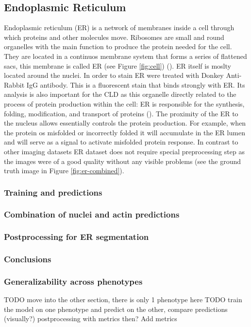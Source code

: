 \subsection{Endoplasmic Reticulum}
    Endoplasmic reticulum (ER) is a network of membranes inside a cell through which proteins and other molecules move. Ribosomes are small and round organelles with the main function to produce the protein needed for the cell. They are located in a continuos membrane system that forms a series of flattened sacs, this membrane is called ER (see Figure \ref{fig:cell}) (\cite{er}). ER itself is moslty located around the nuclei. In order to stain ER were treated with Donkey Anti-Rabbit IgG antibody. This is a fluorescent stain that binds strongly with ER. Its analysis is also important for the CLD as this organelle directly related to the process of protein production within the cell: ER is responsible for the synthesis, folding, modification, and transport of proteins (\cite{er_2}). The proximity of the ER to the nucleus allows essentially controls the protein production. For example, when the protein os misfolded or incorrectly folded it will accumulate in the ER lumen and will serve as a signal to activate misfolded protein response. In contrast to other imaging datasets ER dataset does not require special preprocessing step as the images were of a good quality without any visible problems (see the ground truth image in Figure \ref{fig:er-combined}).
    
    \subsubsection{Training and predictions}
        
    \subsubsection{Combination of nuclei and actin predictions}
        
    \subsubsection{Postprocessing for ER segmentation}
        
    \subsubsection{Conclusions}
        
    \subsubsection{Generalizability across phenotypes}
        TODO move into the other section, there is only 1 phenotype here
        TODO train the model on one phenotype and predict on the other, compare predictions (visually?) 
        postprocessing with metrics then?
        Add metrics

    